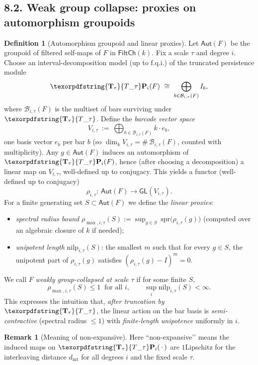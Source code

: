 \documentclass[11pt]{article}
\numberwithin{equation}{section}
\theoremstyle{plain}
\theoremstyle{definition}
\theoremstyle{remark}
\DeclareRobustCommand{\hyp}{\nobreakdash-}
\theoremstyle{plain}
\theoremstyle{definition}
\numberwithin{equation}{section}
\theoremstyle{definition}
\newtheorem{definition}[theorem]{Definition}
\newtheorem{remark}[theorem]{Remark}
\DeclareRobustCommand{\FiltCh}[1]{\mathsf{FiltCh}(#1)}
\DeclareRobustCommand{\Ttau}{\texorpdfstring{\ensuremath{\mathbf{T}_{\tau}}}{T\_\tau}}
\numberwithin{equation}{section}
\theoremstyle{plain}
\theoremstyle{definition}
\theoremstyle{remark}
\providecommand{\Tfun}[1]{\mathbf{T}_{#1}}
\providecommand{\Ttau}{\Tfun{\tau}}
\begin{document}
\subsection*{8.2. Weak group collapse: proxies on automorphism groupoids}
\begin{definition}[Automorphism groupoid and linear proxies]\label{def:group-proxy}
Let \(\mathsf{Aut}(F)\) be the groupoid of filtered self\hyp maps of \(F\) in \(\FiltCh{k}\).
Fix a scale \(\tau\) and degree \(i\).
Choose an interval\hyp decomposition model (up to f.q.i.) of the truncated persistence module
\[
  \Ttau\mathbf{P}_i(F)\ \cong\ \bigoplus_{b\in \mathcal{B}_{i,\tau}(F)} I_b,
\]
where \(\mathcal{B}_{i,\tau}(F)\) is the multiset of bars surviving under \(\Ttau\).
Define the \emph{barcode vector space}
\[
  V_{i,\tau}\ :=\ \bigoplus_{b\in \mathcal{B}_{i,\tau}(F)} k\cdot e_b,
\]
one basis vector \(e_b\) per bar \(b\) (so \(\dim_k V_{i,\tau}=\#\,\mathcal{B}_{i,\tau}(F)\), counted with multiplicity).
Any \(g\in \mathsf{Aut}(F)\) induces an automorphism of \(\Ttau\mathbf{P}_i(F)\), hence (after choosing a decomposition) a linear map on \(V_{i,\tau}\), well\hyp defined up to conjugacy.
This yields a functor (well\hyp defined up to conjugacy)
\[
  \rho_{i,\tau}:\ \mathsf{Aut}(F)\longrightarrow \mathsf{GL}(V_{i,\tau}).
\]
For a finite generating set \(S\subset \mathsf{Aut}(F)\) we define the \emph{linear proxies}:
\begin{itemize}
  \item \emph{spectral radius bound} \(\rho_{\max,i,\tau}(S):=\sup_{g\in S}\ \mathrm{spr}\big(\rho_{i,\tau}(g)\big)\) (computed over an algebraic closure of \(k\) if needed);
  \item \emph{unipotent length} \(\mathrm{nilp}_{i,\tau}(S)\): the smallest \(m\) such that for every \(g\in S\), the unipotent part of \(\rho_{i,\tau}(g)\) satisfies \((\rho_{i,\tau}(g)-I)^{m}=0\).
\end{itemize}
We call \(F\) \emph{weakly group\hyp collapsed at scale \(\tau\)} if for some finite \(S\),
\[
  \rho_{\max,i,\tau}(S)\le 1\ \text{ for all \(i\)},\qquad \sup_i \mathrm{nilp}_{i,\tau}(S)<\infty.
\]
This expresses the intuition that, \emph{after truncation by \(\Ttau\)}, the linear action on the bar basis is \emph{semi\hyp contractive} (spectral radius \(\le 1\)) with \emph{finite\hyp length unipotence} uniformly in \(i\).
\end{definition}

\begin{remark}[Meaning of non\hyp expansive]\label{rk:nonexp-meaning}
Here “non\hyp expansive’’ means the induced maps on \(\Ttau\mathbf{P}_i(\,{\cdot}\,)\) are \(1\)\nobreakdash Lipschitz for the interleaving distance \(d_{\mathrm{int}}\) for all degrees \(i\) and the fixed scale \(\tau\).
\end{remark}
\end{document}
